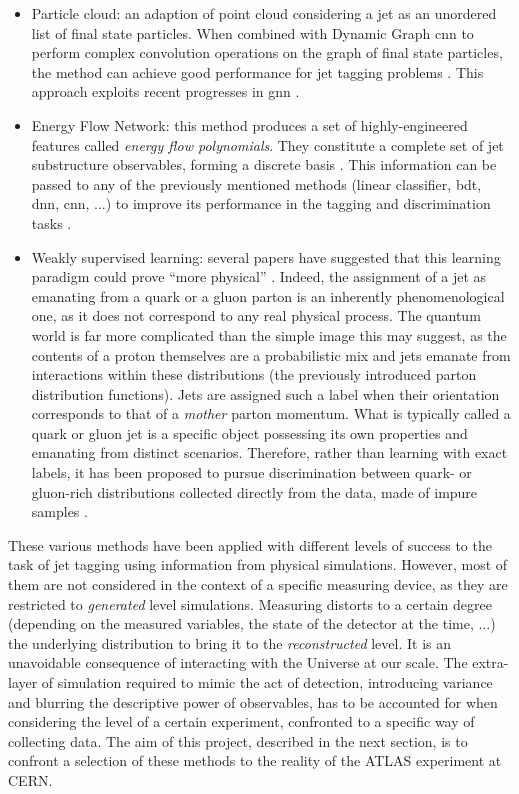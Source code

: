 \begin{itemize}
\item Particle cloud: an adaption of point cloud considering a jet as an unordered list of final state particles. When combined with Dynamic Graph \gls{cnn} to perform complex convolution operations on the graph of final state particles, the method can achieve good performance for jet tagging problems \cite{ParticleNet}. This approach exploits recent progresses in \gls{gnn} \cite{Survey_GNN}.
\item Energy Flow Network: this method produces a set of highly-engineered features called \textit{energy flow polynomials}. They constitute a complete set of jet substructure observables, forming a discrete basis \cite{Basis_Jet_Energy_Flow}. This information can be passed to any of the previously mentioned methods (linear classifier, \gls{bdt}, \gls{dnn}, \gls{cnn}, ...) to improve its performance in the tagging and discrimination tasks \cite{Komiske2019EnergyFN, Number_Charged_Jet}. 
\item Weakly supervised learning: several papers have suggested that this learning paradigm could prove ``more physical'' \cite{Definition_QGJets}. Indeed, the assignment of a jet as emanating from a quark or a gluon parton is an inherently phenomenological one, as it does not correspond to any real physical process. The quantum world is far more complicated than the simple image this may suggest, as the contents of a proton themselves are a probabilistic mix and jets emanate from interactions within these distributions (the previously introduced parton distribution functions). Jets are assigned such a label when their orientation corresponds to that of a \textit{mother} parton momentum. What is typically called a quark or gluon jet is a specific object possessing its own properties and emanating from distinct scenarios. Therefore, rather than learning with exact labels, it has been proposed to pursue discrimination between quark- or gluon-rich distributions collected directly from the data, made of impure samples \cite{WS_taxonomy, WS_Classification_HEP, Classification_Impure_samples, Classification_no_Label_HEP}.
\end{itemize}

These various methods have been applied with different levels of success to the task of jet tagging using information from physical simulations. However, most of them are not considered in the context of a specific measuring device, as they are restricted to \textit{generated} level simulations. Measuring distorts to a certain degree (depending on the measured variables, the state of the detector at the time, ...) the underlying distribution to bring it to the \textit{reconstructed} level. It is an unavoidable consequence of interacting with the Universe at our scale. The extra-layer of simulation required to mimic the act of detection, introducing variance and blurring the descriptive power of observables, has to be accounted for when considering the level of a certain experiment, confronted to a specific way of collecting data. The aim of this project, described in the next section, is to confront a selection of these methods to the reality of the ATLAS experiment at CERN. 

